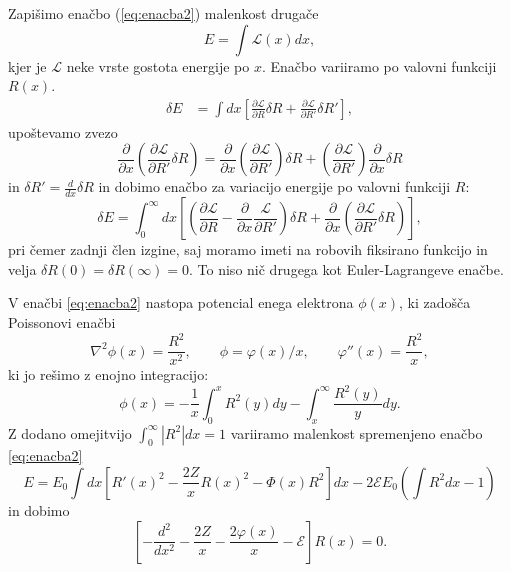 \documentclass[12pt,a4paper]{article}
\begin{document}
Zapišimo enačbo (\ref{eq:enacba2}) malenkost drugače
\begin{equation*}
E=\int \mathcal{L}(x) dx, 
\end{equation*}
kjer je $\mathcal{L}$ neke vrste gostota energije po $x$. Enačbo variiramo po valovni funkciji $R(x)$.
\begin{align*}
\delta E &= \int dx \left[ \frac{ \partial \mathcal{L}}{\partial R}  \delta R + \frac{\partial \mathcal{L}}{\partial R'} \delta R'\right],
\end{align*}
upoštevamo zvezo
\begin{equation*}
\frac{\partial}{\partial x} \left( \frac{\partial \mathcal{L}}{ \partial R'}\delta R \right)= \frac{\partial}{\partial x} \left( \frac{\partial \mathcal{L}}{\partial R'} \right) \delta R + \left( \frac{\partial \mathcal{L}}{\partial R'} \right) \frac{\partial}{\partial x} \delta R
\end{equation*}
in
$\delta R' = \frac{d}{dx} \delta R$ in dobimo enačbo za variacijo energije po valovni funkciji $R$:
\begin{equation}\label{eq:enacba3}
\delta E= \int_0 ^{\infty} dx \left[  \left( \frac{\partial \mathcal{L}}{\partial R} - \frac{\partial }{\partial x } \frac{\mathcal{L}}{\partial R'} \right) \delta R  + \frac{\partial }{\partial x} \left( \frac{\partial \mathcal{L}}{\partial R'} \delta R \right)\right],
\end{equation}
pri čemer zadnji člen izgine, saj moramo imeti na robovih fiksirano funkcijo in velja $\delta R(0) = \delta R(\infty)=0$. To niso nič drugega kot Euler-Lagrangeve enačbe.

V enačbi \ref{eq:enacba2} nastopa potencial enega elektrona $\phi(x)$, ki zadošča Poissonovi enačbi
\begin{equation*}
\nabla ^{2} \phi (x)= \frac{R^{2}}{x^{2}}, \qquad \phi = \varphi(x)/x, \qquad \varphi '' (x)= \frac{R^{2}}{x},
\end{equation*}
ki jo rešimo z enojno integracijo:
\begin{equation}\label{eq:enojna_integracija}
\phi (x)= -\frac{1}{x}\int _0 ^{x} R^{2} (y) dy - \int_x ^{\infty} \frac{R^{2}(y)}{y}dy.
\end{equation}
Z dodano omejitvijo $\int _0 ^{\infty} |R^{2}| dx =1$ variiramo malenkost spremenjeno enačbo \ref{eq:enacba2}
\begin{equation}
E=E_0 \int dx \left[ R'(x)^{2} - \frac{2Z}{x}R(x)^{2} -\Phi(x) R^{2}\right] dx - 2\mathcal{E}E_0\left( \int R^{2}dx -1\right)
\end{equation}
in dobimo
\begin{equation} \label{eq:iteracija}
\left[ -\frac{d^{2}}{dx^{2}} - \frac{2Z}{x}- \frac{2\varphi(x)}{x}- \mathcal{E}   \right]R(x)=0.
\end{equation}
\end{document}
